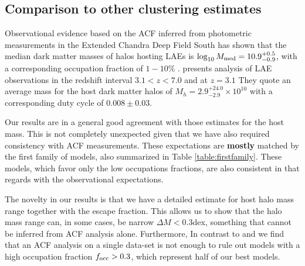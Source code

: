 \documentclass[usenatbib]{mn2e}
\newcommand{\hMsun}{{\ifmmode{h^{-1}{\rm
        {M_{\odot}}}}\else{$h^{-1}{\rm{M_{\odot}}}$}\fi}}
\newcommand{\Msun}{{\ifmmode{{\rm {M_{\odot}}}}\else{${\rm{M_{\odot}}}$}\fi}}
\begin{document}
\subsection{Comparison to other clustering estimates}

Observational evidence based on the ACF inferred from photometric
measurements in the Extended Chandra Deep Field South has shown that
the median dark matter masses of halos hosting LAEs is
$\log_{10}M_{\rm  med}=10.9^{+0.5}_{-0.9}$\Msun, with a corresponding
occupation fraction of $1-10\%$  \citep{Gawiser07}.  \cite{Ouchi2010}
presents analysis of LAE observations in the redshift interval
$3.1<z<7.0$ and at $z=3.1$ They quote an average mass for the host
dark matter halos of $M_{h}=2.9^{+24.0}_{-2.9}\times 10^{10}$ \hMsun
with a corresponding duty cycle of $0.008\pm 0.03$.  

Our results are in a general good agreement with those estimates for
the host mass. This is not completely unexpected given that we have
also required consistency with ACF measurements. These expectations
are {\bf mostly} matched by the first family of models, also summarized in Table
\ref{table:firstfamily}. These models, which favor only the 
low occupations fractions, are also consistent in that regards with
the observational expectations.

The novelty in our results is that we have a detailed estimate for 
host halo mass range together with the escape fraction. This allows us
to show that the halo mass range can, in some cases, be narrow $\Delta M <
0.3$dex, something that cannot be inferred from ACF analysis alone.
Furthermore, In contrast to \citep{Gawiser07} and \citep{Ouchi2010} we
find that an ACF analysis on a single data-set is not enough to rule
out models with a high occupation fraction $f_{\rm occ}>0.3$, which
represent half of our best models. 
\end{document}
